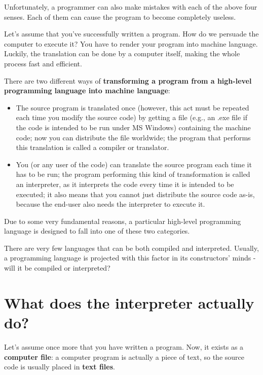 \documentclass[a4paper,10pt]{article}
\begin{document}
Unfortunately, a programmer can also make mistakes with each of the above four senses. Each of them can cause the program to become completely useless.
\newline

Let's assume that you've successfully written a program. How do we persuade the computer to execute it? You have to render your program into machine language. Luckily, the translation can be done by a computer itself, making the whole process fast and efficient.
\newline

There are two different ways of \textbf{transforming a program from a high-level programming language into machine language}:
\begin{itemize}
    \item The source program is translated once (however, this act must be repeated each time you modify the source code) by getting a file (e.g., an .exe file if the code is intended to be run under MS Windows) containing the machine code; now you can distribute the file worldwide; the program that performs this translation is called a compiler or translator.
    \item You (or any user of the code) can translate the source program each time it has to be run; the program performing this kind of transformation is called an interpreter, as it interprets the code every time it is intended to be executed; it also means that you cannot just distribute the source code as-is, because the end-user also needs the interpreter to execute it.
\end{itemize}

Due to some very fundamental reasons, a particular high-level programming language is designed to fall into one of these two categories.
\newline

There are very few languages that can be both compiled and interpreted. Usually, a programming language is projected with this factor in its constructors' minds - will it be compiled or interpreted?

\section{What does the interpreter actually do?}
Let's assume once more that you have written a program. Now, it exists as a \textbf{computer file}: a computer program is actually a piece of text, so the source code is usually placed in \textbf{text files}.
\newline
\end{document}
